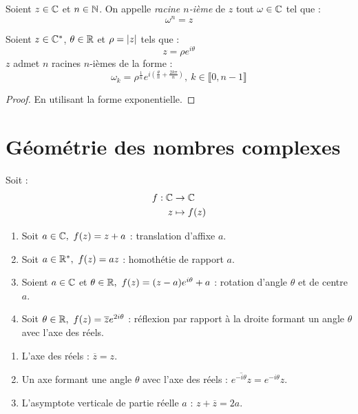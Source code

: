 \begin{definition}
	Soient $z \in \mathbb{C}$ et $n \in \mathbb{N}$. On appelle \emph{racine $n$-ième} de $z$ tout $\omega \in \mathbb{C}$ tel que :
	\[ \omega^n = z \] 
\end{definition}

\begin{proposition}
	Soient $z \in \mathbb{C}^*$, $\theta \in \mathbb{R}$ et $\rho = \abs{z}$ tels que :
	\[ z = \rho e^{i\theta} \]
	$z$ admet $n$ racines $n$-ièmes de la forme :
	\[ \omega_k = \rho^{\frac{1}{n}} e^{i \left( \frac{\theta}{n} + \frac{2 k \pi}{n} \right)},\ k \in \llbracket 0, n - 1 \rrbracket \]
\end{proposition}

\begin{proof}
	En utilisant la forme exponentielle.
\end{proof}

\section{Géométrie des nombres complexes}
\begin{proposition}
	Soit :
	\begin{align*}
		f : \mathbb{C} &\to \mathbb{C} \\ 
		z &\mapsto f(z)
	\end{align*}
	\begin{enumerate}
		\item Soit $a \in \mathbb{C},\ f(z) = z + a$ : translation d'affixe $a$.
		\item Soit $a \in \mathbb{R}^*,\ f(z) = az$ : homothétie de rapport $a$.
		\item Soient $a \in \mathbb{C}$ et $\theta \in \mathbb{R},\ f(z) = (z-a)e^{i\theta} + a$ : rotation d'angle $\theta$ et de centre $a$.
		\item Soit $\theta \in \mathbb{R},\ f(z) = \overline{z} e^{2i\theta}$ : réflexion par rapport à la droite formant un angle $\theta$ avec l'axe des réels.
	\end{enumerate}
\end{proposition}

\begin{proposition}
	\leavevmode
	\begin{enumerate}
		\item L'axe des réels : $\overline{z} = z$.
		\item Un axe formant une angle $\theta$ avec l'axe des réels : $\overline{e^{-i \theta}z} = e^{-i \theta} z$.
		\item L'asymptote verticale de partie réelle $a$ : $z + \overline{z} = 2a$.
	\end{enumerate}
\end{proposition}